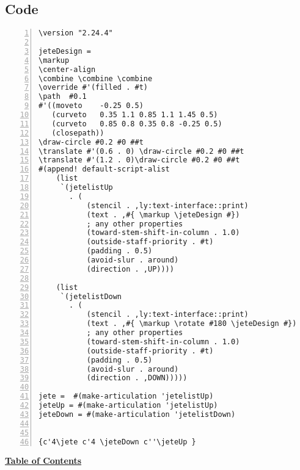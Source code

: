 \subsection{Code}
\begin{Verbatim}[numbers=left,xleftmargin=5mm]
\version "2.24.4"

jeteDesign =
\markup
\center-align
\combine \combine \combine
\override #'(filled . #t)
\path  #0.1
#'((moveto    -0.25 0.5)
   (curveto   0.35 1.1 0.85 1.1 1.45 0.5)
   (curveto   0.85 0.8 0.35 0.8 -0.25 0.5)
   (closepath))
\draw-circle #0.2 #0 ##t
\translate #'(0.6 . 0) \draw-circle #0.2 #0 ##t
\translate #'(1.2 . 0)\draw-circle #0.2 #0 ##t
#(append! default-script-alist
    (list
     `(jetelistUp
       . (
           (stencil . ,ly:text-interface::print)
           (text . ,#{ \markup \jeteDesign #})
           ; any other properties
           (toward-stem-shift-in-column . 1.0)
           (outside-staff-priority . #t)
           (padding . 0.5)
           (avoid-slur . around)
           (direction . ,UP))))

    (list
     `(jetelistDown
       . (
           (stencil . ,ly:text-interface::print)
           (text . ,#{ \markup \rotate #180 \jeteDesign #})
           ; any other properties
           (toward-stem-shift-in-column . 1.0)
           (outside-staff-priority . #t)
           (padding . 0.5)
           (avoid-slur . around)
           (direction . ,DOWN)))))

jete =  #(make-articulation 'jetelistUp)
jeteUp = #(make-articulation 'jetelistUp)
jeteDown = #(make-articulation 'jetelistDown)


{c'4\jete c'4 \jeteDown c''\jeteUp }
\end{Verbatim}
\hyperref[sec:toc]{\textbf{Table of Contents}}
\vfill \break
